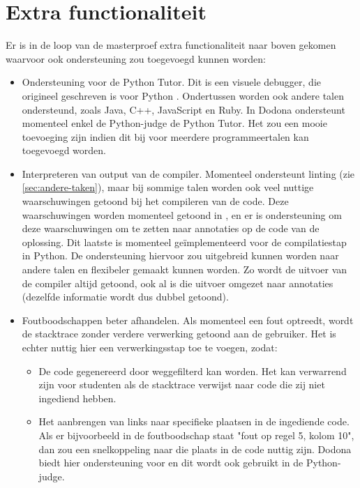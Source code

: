 \section{Extra functionaliteit}\label{sec:kleinere-functies}

Er is in de loop van de masterproef extra functionaliteit naar boven gekomen waarvoor ook ondersteuning zou toegevoegd kunnen worden:

\begin{itemize}
    \item Ondersteuning voor de Python Tutor.
    Dit is een visuele debugger, die origineel geschreven is voor Python \autocite{10.1145/2445196.2445368}.
    Ondertussen worden ook andere talen ondersteund, zoals Java, C++, JavaScript en Ruby.
    In Dodona ondersteunt momenteel enkel de Python-judge de Python Tutor.
    Het zou een mooie toevoeging zijn indien dit bij \tested{} voor meerdere programmeertalen kan toegevoegd worden.
    \item Interpreteren van output van de compiler.
    Momenteel ondersteunt \tested{} linting (zie \cref{sec:andere-taken}), maar bij sommige talen worden ook veel nuttige waarschuwingen getoond bij het compileren van de code.
    Deze waarschuwingen worden momenteel getoond in \tested{}, en er is ondersteuning om deze waarschuwingen om te zetten naar annotaties op de code van de oplossing.
    Dit laatste is momenteel geïmplementeerd voor de compilatiestap in Python.
    De ondersteuning hiervoor zou uitgebreid kunnen worden naar andere talen en flexibeler gemaakt kunnen worden.
    Zo wordt de uitvoer van de compiler altijd getoond, ook al is die uitvoer omgezet naar annotaties (dezelfde informatie wordt dus dubbel getoond).
    \item Foutboodschappen beter afhandelen.
    Als momenteel een fout optreedt, wordt de stacktrace zonder verdere verwerking getoond aan de gebruiker.
    Het is echter nuttig hier een verwerkingsstap toe te voegen, zodat:
    \begin{itemize}
        \item De code gegenereerd door \tested{} weggefilterd kan worden.
        Het kan verwarrend zijn voor studenten als de stacktrace verwijst naar code die zij niet ingediend hebben.
        \item Het aanbrengen van links naar specifieke plaatsen in de ingediende code.
        Als er bijvoorbeeld in de foutboodschap staat "fout op regel 5, kolom 10", dan zou een snelkoppeling naar die plaats in de code nuttig zijn.
        Dodona biedt hier ondersteuning voor en dit wordt ook gebruikt in de Python-judge.

\end{itemize}
\end{itemize}
